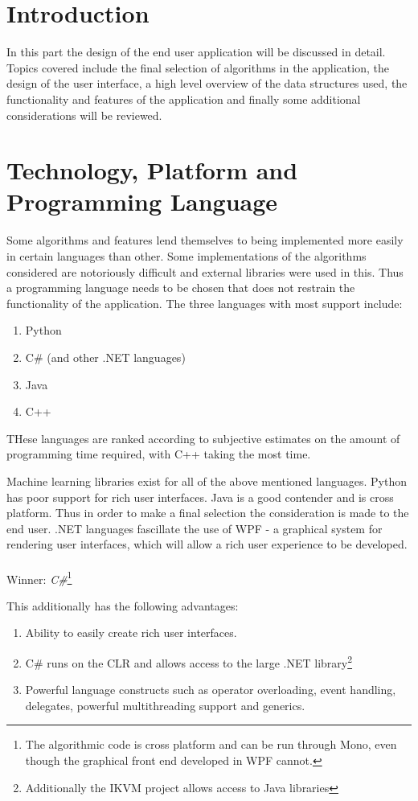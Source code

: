 

\chapter{Introduction}
In this part the design of the end user application will be discussed in detail. Topics covered include the final selection of algorithms in the application, the design of the user interface, a high level overview of the data structures used, the functionality and features of the application and finally some additional considerations will be reviewed.

\chapter{Technology, Platform and Programming Language}
Some algorithms and features lend themselves to being implemented more easily in certain languages than other. Some implementations of the algorithms considered are notoriously difficult and external libraries were used in this. Thus a programming language needs to be chosen that does not restrain the functionality of the application. 
The three languages with most support include:
\begin{enumerate}
\item Python
\item C\# (and other .NET languages)
\item Java
\item C++
\end{enumerate}
THese languages are ranked according to subjective estimates on the amount of programming time required, with C++ taking the most time.

Machine learning libraries exist for all of the above mentioned languages. Python has poor support for rich user interfaces. Java is a good contender and is cross platform. Thus in order to make a final selection the consideration is made to the end user.  .NET languages fascillate the use of \ac{WPF} - a graphical system for rendering user interfaces, which will allow a rich user experience to be developed.
\\
\\
Winner: \emph{C\#}\footnote{The algorithmic code is cross platform and can be run through Mono, even though the graphical front end developed in \ac{WPF} cannot.}

This additionally has the following advantages:
\begin{enumerate}
\item Ability to easily create rich user interfaces.
\item C\# runs on the CLR and allows access to the large .NET library\footnote{Additionally the IKVM project allows access to Java libraries}
\item Powerful language constructs such as operator overloading, event handling, delegates, powerful multithreading support and generics.
\end{enumerate}


